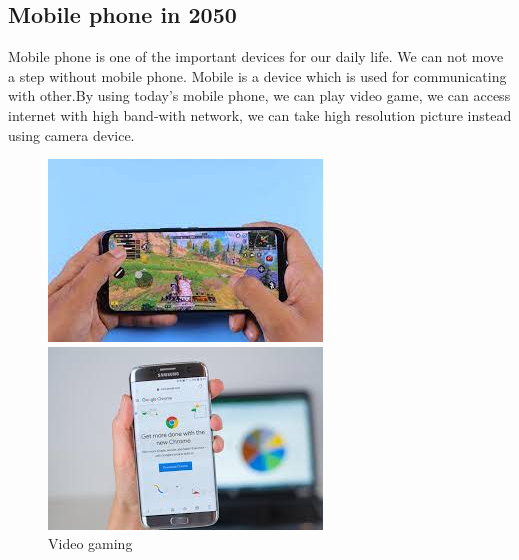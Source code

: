 \subsection{Mobile phone in 2050}
Mobile phone is one of the important devices for our daily life. We can not move a step without mobile phone. Mobile is a device which is used for communicating with other.By using today's mobile phone, we can play video game, we can access internet with high band-with network, we can take high resolution picture instead using camera device.\\
\begin{figure}[h]
    \centering
    \begin{minipage}[b]{.49\textwidth}
    \includegraphics[width = 1\linewidth]{pic/gam.jpeg}
     \caption{Video gaming} 
     \label{fig:fig8}
    \end{minipage}
    \begin{minipage}[b]{.49\textwidth}
    \includegraphics[width = 1\linewidth]{pic/brows.jpeg}

\end{minipage}
\end{figure}
